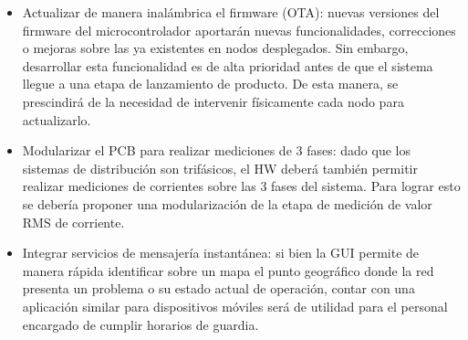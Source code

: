 \begin{itemize}
	\item Actualizar de manera inalámbrica el firmware (OTA): nuevas versiones del firmware del microcontrolador aportarán nuevas funcionalidades, correcciones o mejoras sobre las ya existentes en nodos desplegados. Sin embargo, desarrollar esta funcionalidad es de alta prioridad antes de que el sistema llegue a una etapa de lanzamiento de producto. De esta manera, se prescindirá de la necesidad de intervenir físicamente cada nodo para actualizarlo.\\
	\item Modularizar el PCB para realizar mediciones de 3 fases: dado que los sistemas de distribución son trifásicos, el HW deberá también permitir realizar mediciones de corrientes sobre las 3 fases del sistema. Para lograr esto se debería proponer una modularización de la etapa de medición de valor RMS de corriente.\\
	\item Integrar servicios de mensajería instantánea: si bien la GUI permite de manera rápida identificar sobre un mapa el punto geográfico donde la red presenta un problema o su estado actual de operación, contar con una aplicación similar para dispositivos móviles será de utilidad para el personal encargado de cumplir horarios de guardia.\\
	
\end{itemize}

